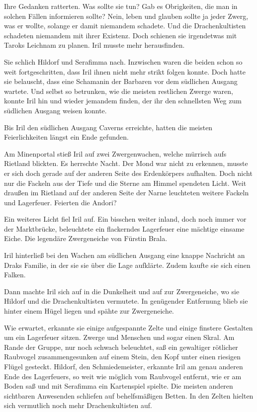 Ihre Gedanken ratterten. Was sollte sie tun? Gab es Obrigkeiten, die man in solchen Fällen informieren sollte? Nein, leben und glauben sollte ja jeder Zwerg, was er wollte, solange er damit niemandem schadete. Und die Drachenkultisten schadeten niemandem mit ihrer Existenz. Doch schienen sie irgendetwas mit Taroks Leichnam zu planen. Iril musste mehr herausfinden.

Sie schlich Hildorf und Serafimma nach. Inzwischen waren die beiden schon so weit fortgeschritten, dass Iril ihnen nicht mehr strikt folgen konnte. Doch hatte sie belauscht, dass eine Schamanin der Barbaren vor dem südlichen Ausgang wartete. Und selbst so betrunken, wie die meisten restlichen Zwerge waren, konnte Iril hin und wieder jemandem finden, der ihr den schnellsten Weg zum südlichen Ausgang weisen konnte.\bigskip







Bis Iril den südlichen Ausgang Caverns erreichte, hatten die meisten Feierlichkeiten längst ein Ende gefunden.

Am Minenportal stieß Iril auf zwei Zwergenwachen, welche mürrisch aufs Rietland blickten. Es herrschte Nacht. Der Mond war nicht zu erkennen, musste er sich doch gerade auf der anderen Seite des Erdenkörpers aufhalten. Doch nicht nur die Fackeln aus der Tiefe und die Sterne am Himmel spendeten Licht. Weit draußen im Rietland auf der anderen Seite der Narne leuchteten weitere Fackeln und Lagerfeuer. Feierten die Andori?

Ein weiteres Licht fiel Iril auf. Ein bisschen weiter inland, doch noch immer vor der Marktbrücke, beleuchtete ein flackerndes Lagerfeuer eine mächtige einsame Eiche. Die legendäre Zwergeneiche von Fürstin Brala.

Iril hinterließ bei den Wachen am südlichen Ausgang eine knappe Nachricht an Draks Familie, in der sie sie über die Lage aufklärte. Zudem kaufte sie sich einen Falken.

Dann machte Iril sich auf in die Dunkelheit und auf zur Zwergeneiche, wo sie Hildorf und die Drachenkultisten vermutete. In genügender Entfernung blieb sie hinter einem Hügel liegen und spähte zur Zwergeneiche.

Wie erwartet, erkannte sie einige aufgespannte Zelte und einige finstere Gestalten um ein Lagerfeuer sitzen. Zwerge und Menschen und sogar einen Skral. Am Rande der Gruppe, nur noch schwach beleuchtet, saß ein gewaltiger rötlicher Raubvogel zusammengesunken auf einem Stein, den Kopf unter einen riesigen Flügel gesteckt. Hildorf, den Schmiedemeister, erkannte Iril am genau anderen Ende des Lagerfeuers, so weit wie möglich vom Raubvogel entfernt, wie er am Boden saß und mit Serafimma ein Kartenspiel spielte. Die meisten anderen sichtbaren Anwesenden schliefen auf behelfsmäßigen Betten. In den Zelten hielten sich vermutlich noch mehr Drachenkultisten auf.

